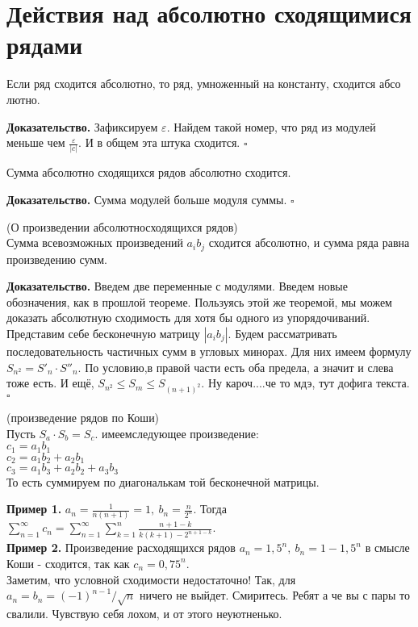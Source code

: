 \section{Действия над абсолютно сходящимися рядами}
\begin{theor}
Если ряд сходится абсолютно, то ряд, умноженный на константу, сходится абсо
лютно. 
\end{theor}
\textbf{Доказательство.} Зафиксируем $\varepsilon$. Найдем такой номер, что
ряд из модулей меньше чем $\frac{\varepsilon}{|c|}$. И в общем эта штука
сходится. 
$\square$ 
\begin{theor}
Сумма абсолютно сходящихся рядов абсолютно сходится.
\end{theor}
\textbf{Доказательство.}  Сумма модулей больше модуля суммы.
$\square$ 
\begin{theor}
    (О произведении абсолютносходящихся рядов)\\
    Сумма всевозможных произведений $a_ib_j$ сходится абсолютно, и сумма ряда
    равна произведению сумм.
\end{theor}
\textbf{Доказательство.} Введем две переменные с модулями. Введем новые
обозначения, как в прошлой теореме. Пользуясь этой же теоремой, мы можем
доказать абсолютную сходимость для хотя бы одного из упорядочиваний. 
Представим себе бесконечную матрицу $|a_ib_j|$. Будем рассматривать 
последовательность частичных сумм в угловых минорах. Для них имеем формулу
$S_{n^2}=S'_n\cdot S''_n$. По условию,в правой части есть оба предела, а 
значит и слева тоже есть. И ещё, $S_{n^2}\leqslant S_m\leqslant S_{(n+1)^2}$.
Ну кароч....че то мдэ, тут дофига текста.
$\square$ 
\begin{defin}
    (произведение рядов по Коши)\\
Пусть $S_a\cdot S_b=S_c$. имеемследующее произведение:\\
$c_1=a_1b_1$\\
 $c_2=a_1b_2+a_2b_1$\\
 $c_3=a_1b_3+a_2b_2+a_3b_3$\\
 То есть суммируем по диагональкам той бесконечной матрицы.
\end{defin}
\textbf{Пример 1.} $a_n=\frac{1}{n(n+1)}=1,~b_n=\frac{n}{2^n}$. Тогда
$\sum\limits_{n=1}^{\infty} c_n=\sum\limits_{n=1}^{\infty} \sum\limits_{k=1}
^{n} \frac{n+1-k}{k(k+1)-2^{n+1-k}}$.\\
\textbf{Пример 2.} Произведение расходящихся рядов $a_n=1,5^n,~b_n=1-1,5^n$
в смысле Коши - сходится, так как $c_n=0,75^n$. \\
Заметим, что условной сходимости недостаточно! Так, для $a_n=b_n=(-1)^{n-1}/
\sqrt{n}$ ничего не выйдет. Смиритесь. Ребят а че вы с пары то свалили. 
Чувствую себя лохом, и от этого неуютненько.
